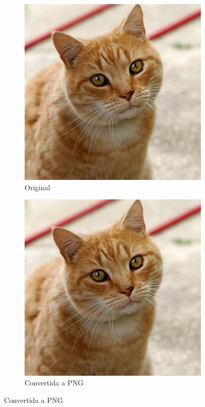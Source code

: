 \documentclass[11pt]{article}
\begin{document}
\begin{figure}
    \centering
    \begin{subfigure}[b]{0.3\textwidth}
        \centering
        \includegraphics[width=\textwidth]{resources/distributed_systems/pipeline_images/input.jpg}
        \caption{Original}
    \end{subfigure}
    \hspace{10mm}
    \begin{subfigure}[b]{0.3\textwidth}
        \centering
        \includegraphics[width=\textwidth]{resources/distributed_systems/pipeline_images/formatted.png}
        \caption{Convertida a PNG}
    \end{subfigure}
    

\end{figure}
\end{document}
